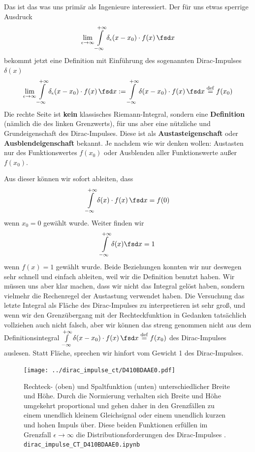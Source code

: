 \begin{Werkzeug}
%
Das ist das was uns primär als Ingenieure interessiert.
%
Der für uns etwas sperrige Ausdruck
\begin{equation}
\lim_{\epsilon\to\infty} \int\limits_{-\infty}^{+\infty}
\delta_\epsilon(x-x_0) \cdot f(x) \, \fsd x
\end{equation}
bekommt jetzt eine Definition mit Einführung des sogenannten Dirac-Impulses $\delta(x)$
\begin{equation}
\label{eq:DiracDistrDef}
\lim_{\epsilon\to\infty} \int\limits_{-\infty}^{+\infty}
\delta_\epsilon(x-x_0) \cdot f(x) \, \fsd x
:= \int\limits_{-\infty}^{+\infty} \delta(x-x_0) \cdot f(x) \, \fsd x \stackrel{\mathrm{def}}= f(x_0)
\end{equation}
%
Die rechte Seite ist \textbf{kein} klassisches Riemann-Integral, sondern eine
\textbf{Definition} (nämlich die des linken Grenzwerts),
für uns aber eine nützliche  und Grundeigenschaft des
Dirac-Impulses. Diese ist als \textbf{Austasteigenschaft} oder
\textbf{Ausblendeigenschaft} bekannt. Je nachdem wie wir denken wollen:
Austasten nur des Funktionswertes $f(x_0)$ oder Ausblenden aller Funktionswerte
außer $f(x_0)$.

Aus dieser können wir sofort ableiten, dass
\begin{equation}
\label{}
\int\limits_{-\infty}^{+\infty} \delta(x) \cdot f(x) \, \fsd x = f(0)
\end{equation}
wenn $x_0=0$ gewählt wurde.
%
Weiter finden wir
\begin{equation}
\int\limits_{-\infty}^{+\infty} \delta(x) \fsd x = 1
\end{equation}
wenn $f(x)=1$ gewählt wurde.
%
Beide Beziehungen konnten wir nur deswegen sehr schnell und einfach ableiten, weil
wir die Definition benutzt haben. Wir müssen uns aber klar machen, dass wir
nicht das Integral gelöst haben, sondern vielmehr die Rechenregel der Austastung
verwendet haben.
%
Die Versuchung das letzte Integral als Fläche des Dirac-Impulses zu interpretieren
ist sehr groß, und wenn wir den Grenzübergang mit der Rechteckfunktion in Gedanken
tatsächlich vollziehen auch nicht falsch, aber wir können das streng genommen
nicht aus dem Definitionsintegral
$\int\limits_{-\infty}^{+\infty} \delta(x-x_0) \cdot f(x) \, \fsd x \stackrel{\mathrm{def}}= f(x_0)$
des Dirac-Impulses auslesen.
%
Statt Fläche, sprechen wir hinfort vom Gewicht 1 des Dirac-Impulses.

\end{Werkzeug}

\begin{figure}[h!]
\texttt{[image: ../dirac\_impulse\_ct/D410BDAAE0.pdf]}
  \caption{Rechteck- (oben) und Spaltfunktion (unten) unterschiedlicher Breite und Höhe.
  Durch die Normierung verhalten sich Breite und Höhe umgekehrt proportional und
  gehen daher in den Grenzfällen zu einem unendlich kleinem Gleichsignal oder einem unendlich kurzen und hohen
  Impuls über. Diese beiden Funktionen erfüllen im Grenzfall $\epsilon\to\infty$
  die Distributionsforderungen des Dirac-Impulses .
  \texttt{dirac\_impulse\_CT\_D410BDAAE0.ipynb}}
  \label{fig:D410BDAAE0}
\end{figure}

